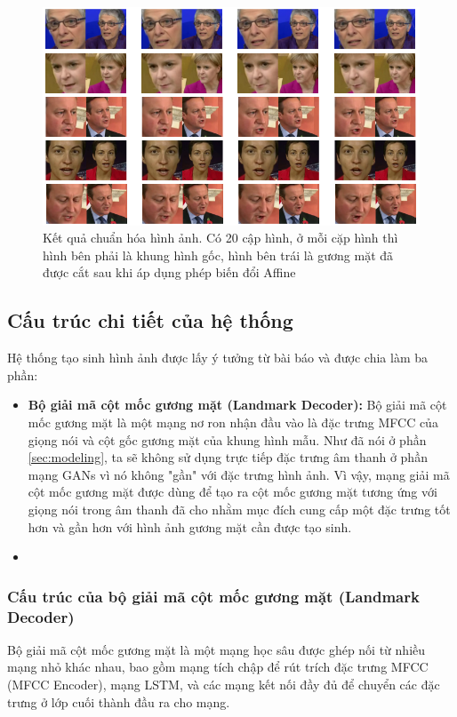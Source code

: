 \begin{figure}[H]
    \centering
    \includegraphics[width=15cm]{./content/materials/preprocess-image.png}
    \caption{Kết quả chuẩn hóa hình ảnh. Có 20 cập hình, ở mỗi cặp hình thì hình bên phải là khung hình gốc, hình bên trái là gương mặt đã được cắt sau khi áp dụng phép biến đổi Affine}
\end{figure}


\subsection{Cấu trúc chi tiết của hệ thống}

Hệ thống tạo sinh hình ảnh được lấy ý tưởng từ bài báo \cite{chen2019} và được chia làm ba phần:
\begin{itemize}
    \item \textbf{Bộ giải mã cột mốc gương mặt (Landmark Decoder):} Bộ giải mã cột mốc gương mặt là một mạng nơ ron nhận đầu vào là đặc trưng MFCC của giọng nói và cột gốc gương mặt của khung hình mẫu. Như đã nói ở phần \ref{sec:modeling}, ta sẽ không sử dụng trực tiếp đặc trưng âm thanh ở phần mạng GANs vì nó không "gần" với đặc trưng hình ảnh. Vì vậy, mạng giải mã cột mốc gương mặt được dùng để tạo ra cột mốc gương mặt tương ứng với giọng nói trong âm thanh đã cho nhằm mục đích cung cấp một đặc trưng tốt hơn và gần hơn với hình ảnh gương mặt cần được tạo sinh.
    \item 
\end{itemize}

\subsubsection{Cấu trúc của bộ giải mã cột mốc gương mặt (Landmark Decoder)}

Bộ giải mã cột mốc gương mặt là một mạng học sâu được ghép nối từ nhiều mạng nhỏ khác nhau, bao gồm mạng tích chập để rút trích đặc trưng MFCC (MFCC Encoder), mạng LSTM, và các mạng kết nối đầy đủ để chuyển các đặc trưng ở lớp cuối thành đầu ra cho mạng.

